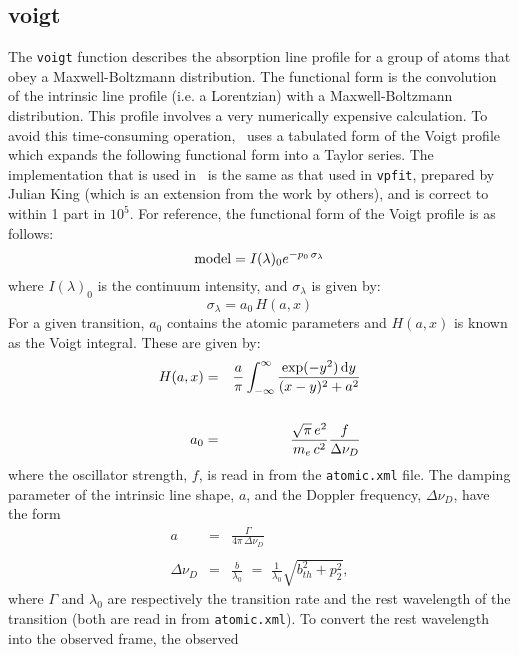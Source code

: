 \subsection{voigt}

The \texttt{voigt} function describes the absorption line profile for a group
of atoms that obey a Maxwell-Boltzmann distribution. The functional form
is the convolution of the intrinsic line profile (i.e. a Lorentzian) with a
Maxwell-Boltzmann distribution. This profile involves a very numerically
expensive calculation. To avoid this time-consuming operation, \alis\
uses a tabulated form of the Voigt profile which expands the following
functional form into a Taylor series. The implementation that is used in
\alis\ is the same as that used in \texttt{vpfit}, prepared by Julian King
(which is an extension from the work by others), and is correct to
within 1 part in $10^5$. For reference, the functional form of the Voigt
profile is as follows:
\begin{equation}
{\rm model}=I(\lambda)_0 e^{-p_0\,\sigma_{\lambda}}
\end{equation}
where $I(\lambda)_0$ is the continuum intensity, and $\sigma_{\lambda}$ is given by:
\begin{equation}
\sigma_{\lambda}=a_{0}\,H(a,x)
\end{equation}
For a given transition, $a_{0}$ contains the atomic parameters
and $H(a,x)$ is known as the Voigt integral. These are given by:
\begin{eqnarray}
H(a,x) & = & \frac{a}{\pi}\int_{-\infty}^{\infty}\frac{\exp(-y^2)\,{\rm d}y}{(x-y)^2+a^2}
\\           
\nonumber
\\
a_{0} & = &\frac{\sqrt{\pi}\,e^2}{m_{e}\,c^{2}}\frac{f}{\Delta\nu_{D}}
\end{eqnarray}
where the oscillator strength, $f$, is read in from the \texttt{atomic.xml} file.
The damping parameter of  the intrinsic line shape, $a$, and the
Doppler frequency, $\Delta\nu_{D}$, have the form
\begin{eqnarray}
a & = &\frac{\Gamma}{4\pi\,\Delta\nu_{D}}
\\
\nonumber
\\
\Delta\nu_{D} & = & \frac{b}{\lambda_{0}} \,\, = \,\, \frac{1}{\lambda_{0}}\sqrt{b_{th}^{2}+p_{2}^{2}},
\end{eqnarray}
where $\Gamma$ and $\lambda_{0}$ are respectively the
transition rate and the rest wavelength of the transition
(both are read in from \texttt{atomic.xml}). To convert the
rest wavelength into the observed frame, the observed
